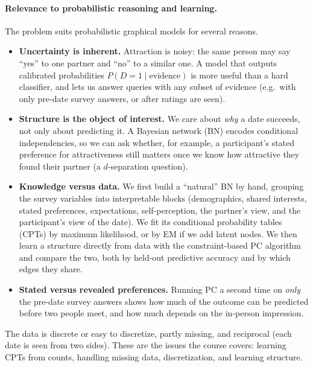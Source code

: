 \documentclass{article}
\begin{document}
\paragraph{Relevance to probabilistic reasoning and learning.}
The problem suits probabilistic graphical models for several reasons.
\begin{itemize}
  \item \textbf{Uncertainty is inherent.} Attraction is noisy: the same
        person may say ``yes'' to one partner and ``no'' to a similar one.
        A model that outputs calibrated probabilities
        $P(D=1 \mid \text{evidence})$ is more useful than a hard
        classifier, and lets us answer queries with any subset of evidence
        (e.g.\ with only pre-date survey answers, or after ratings are seen).
  \item \textbf{Structure is the object of interest.} We care about
        \emph{why} a date succeeds, not only about predicting it. A Bayesian
        network (BN) encodes conditional independencies, so we can ask
        whether, for example, a participant's stated preference for
        attractiveness still matters once we know how attractive they found
        their partner (a $d$-separation question).
  \item \textbf{Knowledge versus data.} We first build a ``natural'' BN by
        hand, grouping the survey variables into interpretable blocks
        (demographics, shared interests, stated preferences, expectations,
        self-perception, the partner's view, and the participant's view of the
        date). We fit its conditional probability tables (CPTs) by maximum
        likelihood, or by EM if we add latent nodes. We then learn a structure
        directly from data with the constraint-based PC algorithm
        \citep{spirtes2000causation} and compare the two, both by held-out
        predictive accuracy and by which edges they share.
  \item \textbf{Stated versus revealed preferences.} Running PC a second time
        on \emph{only} the pre-date survey answers shows how much of the
        outcome can be predicted before two people meet, and how much depends
        on the in-person impression.
\end{itemize}
The data is discrete or easy to discretize, partly missing, and reciprocal
(each date is seen from two sides). These are the issues the course
covers: learning CPTs from counts, handling missing data, discretization, and
learning structure.

\end{document}
